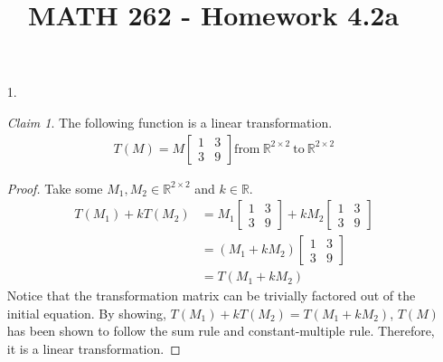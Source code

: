 \documentclass[letterpaper,12pt]{article}
\author{}
\title{MATH 262 - Homework 4.2a}
\date{} %
\theoremstyle{remark}
\newtheorem*{claim}{Claim}
\begin{document}
\maketitle

\begin{enumerate}
  \item[1.]
    \begin{claim}
      The following function is a linear transformation.
      \begin{align*}
        T(M) = M\begin{bmatrix}
          1 & 3 \\
          3 & 9
        \end{bmatrix}
        \text{from} \ \mathbb{R}^{2 \times 2} \ \text{to} \ \mathbb{R}^{2 \times 2}
      \end{align*}
    \end{claim}
    \begin{proof}
      Take some $M_1,M_2 \in \mathbb{R}^{2 \times 2}$ and $k \in \mathbb{R}$.
      \begin{align*}
        T(M_1) + kT(M_2) &=
        M_1\begin{bmatrix}
          1 & 3 \\
          3 & 9
        \end{bmatrix} +
        kM_2\begin{bmatrix}
          1 & 3 \\
          3 & 9
        \end{bmatrix} \\
        &= (M_1 + kM_2)\begin{bmatrix}
          1 & 3 \\
          3 & 9
        \end{bmatrix} \\
        &= T(M_1 + kM_2)
      \end{align*}
      Notice that the transformation matrix can be trivially factored out of the initial equation. By showing, $T(M_1) + kT(M_2) = T(M_1 + kM_2)$, $T(M)$ has been shown to follow the sum rule and constant-multiple rule. Therefore, it is a linear transformation.
    \end{proof}
\end{enumerate}
\end{document}
